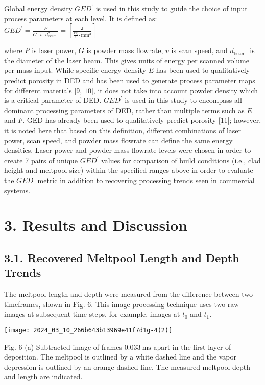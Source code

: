 \documentclass[10pt]{article}
\begin{document}
Global energy density $G E D^{\prime}$ is used in this study to guide the choice of input process parameters at each level. It is defined as:\\
$G E D^{\prime}=\frac{P}{G \cdot v \cdot d_{\text {beam }}^{2}}=\left[\frac{\mathrm{J}}{\frac{\mathrm{kg}}{\mathrm{s}} \cdot \mathrm{mm^{3 }}}\right]$

where $P$ is laser power, $G$ is powder mass flowrate, $v$ is scan speed, and $d_{\text {beam }}$ is the diameter of the laser beam. This gives units of energy per scanned volume per mass input. While specific energy density $E$ has been used to qualitatively predict porosity in DED and has been used to generate process parameter maps for different materials [9, $10]$, it does not take into account powder density which is a critical parameter of DED. $G E D^{\prime}$ is used in this study to encompass all dominant processing parameters of DED, rather than multiple terms such as $E$ and $F$. GED has already been used to qualitatively predict porosity [11]; however, it is noted here that based on this definition, different combinations of laser power, scan speed, and powder mass flowrate can define the same energy densities. Laser power and powder mass flowrate levels were chosen in order to create 7 pairs of unique $G E D^{\prime}$ values for comparison of build conditions (i.e., clad height and meltpool size) within the specified ranges above in order to evaluate the $G E D^{\prime}$ metric in addition to recovering processing trends seen in commercial systems.

\section*{3. Results and Discussion}
\subsection*{3.1. Recovered Meltpool Length and Depth Trends}
The meltpool length and depth were measured from the difference between two timeframes, shown in Fig. 6. This image processing technique uses two raw images at subsequent time steps, for example, images at $t_{0}$ and $t_{1}$.

\begin{center}
\texttt{[image: 2024\_03\_10\_266b643b13969e41f7d1g-4(2)]}
\end{center}

Fig. 6 (a) Subtracted image of frames $0.033 \mathrm{~ms}$ apart in the first layer of deposition. The meltpool is outlined by a white dashed line and the vapor depression is outlined by an orange dashed line. The measured meltpool depth and length are indicated.
\end{document}
